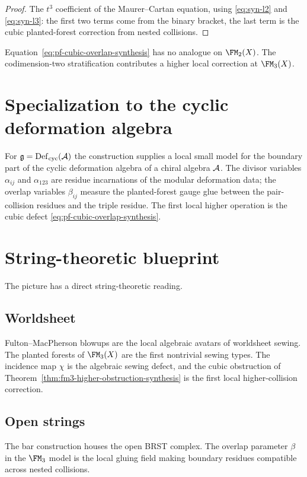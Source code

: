 \begin{proof}
The $t^3$ coefficient of the Maurer--Cartan equation, using
\eqref{eq:syn-l2} and \eqref{eq:syn-l3}: the first two terms come from the
binary bracket, the last term is the cubic planted-forest correction from
nested collisions.
\end{proof}

Equation~\eqref{eq:pf-cubic-overlap-synthesis} has no analogue on $\FM_2(X)$.
The codimension-two stratification contributes a higher local correction at
$\FM_3(X)$.

\section{Specialization to the cyclic deformation algebra}

For $\mathfrak g=\operatorname{Def}_{\mathrm{cyc}}(\mathcal A)$ the construction supplies a local small model
for the boundary part of the cyclic deformation algebra of a chiral algebra
$\mathcal A$. The divisor variables $\alpha_{ij}$ and $\alpha_{123}$ are residue
incarnations of the modular deformation data; the overlap variables $\beta_{ij}$
measure the planted-forest gauge glue between the pair-collision residues and
the triple residue. The first local higher operation is the cubic defect
\eqref{eq:pf-cubic-overlap-synthesis}.

\section{String-theoretic blueprint}

The picture has a direct string-theoretic reading.

\subsection*{Worldsheet}
Fulton--MacPherson blowups are the local algebraic avatars of worldsheet sewing.
The planted forests of $\FM_3(X)$ are the first nontrivial sewing types. The
incidence map $\chi$ is the algebraic sewing defect, and the cubic obstruction
of Theorem~\ref{thm:fm3-higher-obstruction-synthesis} is the first local
higher-collision correction.

\subsection*{Open strings}
The bar construction houses the open BRST complex. The overlap parameter $\beta$
in the $\FM_3$ model is the local gluing field making boundary residues
compatible across nested collisions.

